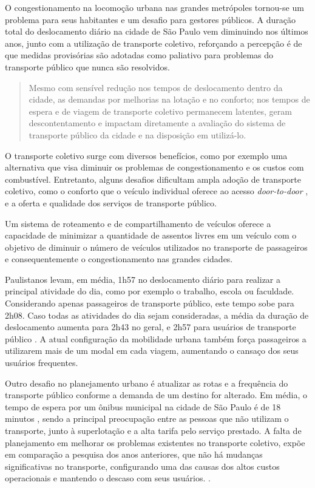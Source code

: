 O congestionamento na locomoção urbana nas grandes metrópoles tornou-se um problema para seus habitantes e um desafio para gestores públicos. A duração total do deslocamento diário na cidade de São Paulo vem diminuindo nos últimos anos, junto com a utilização de transporte coletivo, reforçando a percepção é de que medidas provisórias são adotadas como paliativo para problemas do transporte público que nunca são resolvidos.
\begin{quote}
Mesmo com sensível redução nos tempos de deslocamento dentro da cidade, as demandas por melhorias na lotação e no conforto; nos tempos de espera e de viagem de transporte coletivo permanecem latentes, geram descontentamento e impactam diretamente a avaliação do sistema de transporte público da cidade e na disposição em utilizá-lo.
\end{quote}

O transporte coletivo surge com diversos benefícios, como por exemplo uma alternativa que visa diminuir os problemas de congestionamento e os custos com combustível. Entretanto, alguns desafios dificultam ampla adoção de transporte coletivo, como o conforto que o veículo individual oferece ao acesso \emph{door-to-door} \cite{FURUHATA201328}, e a oferta e qualidade dos serviços de transporte público.

Um sistema de roteamento e de compartilhamento de veículos oferece a capacidade de minimizar a quantidade de assentos livres em um veículo com o objetivo de diminuir o número de veículos utilizados no transporte de passageiros e consequentemente o congestionamento nas grandes cidades. \cite{MOURAD2019323}

Paulistanos levam, em média, 1h57 no deslocamento diário para realizar a principal atividade do dia, como por exemplo o trabalho, escola ou faculdade. Considerando apenas passageiros de transporte público, este tempo sobe para 2h08. Caso todas as atividades do dia sejam consideradas, a média da duração de deslocamento aumenta para 2h43 no geral, e 2h57 para usuários de transporte público \cite{viveremsp}. A atual configuração da mobilidade urbana também força passageiros a utilizarem mais de um modal em cada viagem, aumentando o cansaço dos seus usuários frequentes.

Outro desafio no planejamento urbano é atualizar as rotas e a frequência do transporte público conforme a demanda de um destino for alterado. Em média, o tempo de espera por um ônibus municipal na cidade de São Paulo é de 18 minutos \cite{viveremsp}, sendo a principal preocupação entre as pessoas que não utilizam o transporte, junto à superlotação e a alta tarifa pelo serviço prestado. A falta de planejamento em melhorar os problemas existentes no transporte coletivo, expõe em comparação a pesquisa dos anos anteriores, que não há mudanças significativas no transporte, configurando uma das causas dos altos custos operacionais e mantendo o descaso com seus usuários. \cite{viveremsp}.

